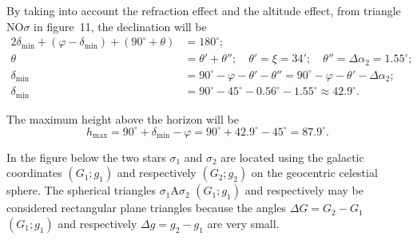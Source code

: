 \begin{description}
  By taking into account the refraction effect and the altitude effect, from
  triangle $\mathrm{N}\mathrm{O}\sigma$ in figure~11, the declination will
  be
  \begin{align*}
  2\delta_{\mathrm{min}} + (\varphi - \delta_{\mathrm{min}})
    + (90^\circ + \theta) &= 180^\circ;\\
  \theta &= \theta' + \theta'';\quad
    \theta' = \xi = 34';\quad
    \theta'' = \Delta\alpha_2 = 1.55^\circ;\\
  \delta_{\mathrm{min}} &= 90^\circ - \varphi - \theta' - \theta''
    = 90^\circ - \varphi - \theta' - \Delta\alpha_2;\\
  \delta_{\mathrm{min}} &= 90^\circ - 45^\circ - 0.56^\circ
    - 1.55^\circ \approx 42.9^\circ.
  \end{align*}

\item[C.2)] The maximum height above the horizon will be
  \[ h_{\mathrm{max}} = 90^\circ + \delta_{\mathrm{min}} - \varphi
     = 90^\circ + 42.9^\circ - 45^\circ = 87.9^\circ. \]
\end{description}

In the figure below the two stars $\sigma_1$ and $\sigma_2$ are located using
the galactic coordinates $(G_1; g_1)$ and respectively $(G_2; g_2)$ on the
geocentric celestial sphere. The spherical triangles $\sigma_1 \mathrm{A}
\sigma_2$ $(G_1;g_1)$ and respectively %
may be considered rectangular plane triangles because the angles
$\Delta G = G_2 - G_1$ $(G_1;g_1)$ and respectively $\Delta g = g_2 - g_1$
are very small.

